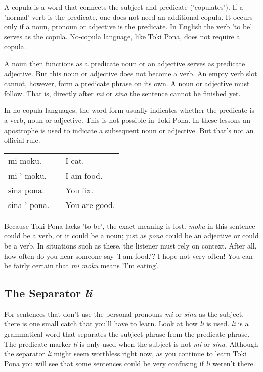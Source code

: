 A copula is a word that connects the subject and predicate ('copulates').
If a 'normal' verb is the predicate, one does not need an additional copula.
It occurs only if a noun, pronoun or adjective is the predicate.
In English the verb 'to be' serves as the copula. 
No-copula language, like Toki Pona, does not require a copula. 

A noun then functions as a predicate noun or an adjective serves as predicate adjective.
But this noun or adjective does not become a verb. 
An empty verb slot cannot, however, form a predicate phrase on its own. 
A noun or adjective must follow. 
That is, directly after \textit{mi} or \textit{sina} the sentence cannot be finished yet.

In no-copula languages, the word form usually indicates whether the predicate is a verb, noun or adjective. 
This is not possible in Toki Pona. 
In these lessons an apostrophe is used to indicate a subsequent noun or adjective. 
But that's not an official rule. 

\begin{supertabular}{p{5cm}|ll}
mi moku. && I eat.  \\
mi ' moku. && I am food. \\  
sina pona. && You fix. \\
sina ' pona. && You are good. \\  
\end{supertabular} 

Because Toki Pona lacks 'to be', the exact meaning is lost. 
\textit{moku} in this sentence could be a verb, or it could be a noun; just as \textit{pona} could be an adjective or could be a verb. 
In situations such as these, the listener must rely on context. 
After all, how often do you hear someone say 'I am food.'? 
I hope not very often! You can be fairly certain that \textit{mi moku} means 'I'm eating'. 

%
\newpage
\subsection*{The Separator \textit{li} }
%
%
For sentences that don't use the personal pronouns \textit{mi} or \textit{sina} as the subject, there is one small catch that you'll have to learn. 
Look at how \textit{li} is used. 
\textit{li} is a grammatical word that separates the subject phrase from the predicate phrase. 
The predicate marker \textit{li} is only used when the subject is not \textit{mi} or \textit{sina}. 
Although the separator \textit{li} might seem worthless right now, as you continue to learn Toki Pona you will see that some sentences could be very confusing if \textit{li} weren't there. 

